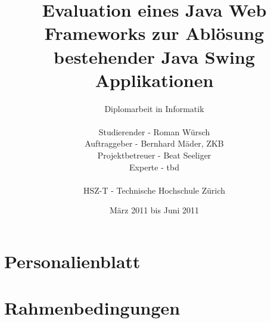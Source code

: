 \documentclass[
11pt, %
a4paper, %
BCOR25mm, %
DIV14, %
footsepline = false, %
headsepline, %
twoside, %
openright,
abstracton, %
listof=totocnumbered, %
bibliography=totocnumbered %
]{scrreprt}
\title{Evaluation eines Java Web Frameworks zur Ablösung bestehender Java Swing
Applikationen}
\author{Diplomarbeit in Informatik\\
    \\
    Studierender - Roman Würsch\\
	Auftraggeber - Bernhard Mäder, ZKB\\
    Projektbetreuer - Beat Seeliger\\
    Experte - tbd\\
	\\
	HSZ-T - Technische Hochschule Zürich}
\date{März 2011 bis Juni 2011}
\begin{document}
  \ifpdf
  \else
  \fi
  
  
  \maketitle
  
  \cleardoublepage
  
  
  
  
  
  \cleardoublepage
  

  
  \tableofcontents
  
  \cleardoublepage
  
  
  
  \chapter{Personalienblatt}

  
  
      
  
  \chapter{Rahmenbedingungen}
  
\end{document}
